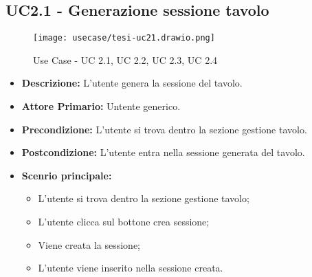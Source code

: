 \subsection{UC2.1 - Generazione sessione tavolo}
\begin{figure}[H]
    \centering
    \texttt{[image: usecase/tesi-uc21.drawio.png]}
    \caption{Use Case - UC 2.1, UC 2.2, UC 2.3, UC 2.4}
\end{figure}
\begin{itemize}
    \item \textbf{Descrizione:} L'utente genera la sessione del tavolo.
    \item \textbf{Attore Primario:} Untente generico.
    \item \textbf{Precondizione:} L'utente si trova dentro la sezione gestione tavolo.
    \item \textbf{Postcondizione:} L'utente entra nella sessione generata del tavolo.
    \item \textbf{Scenrio principale:}
    \begin{itemize}
        \item L'utente si trova dentro la sezione gestione tavolo;
        \item L'utente clicca sul bottone crea sessione;
        \item Viene creata la sessione;
        \item L'utente viene inserito nella sessione creata.
    \end{itemize}
\end{itemize}
